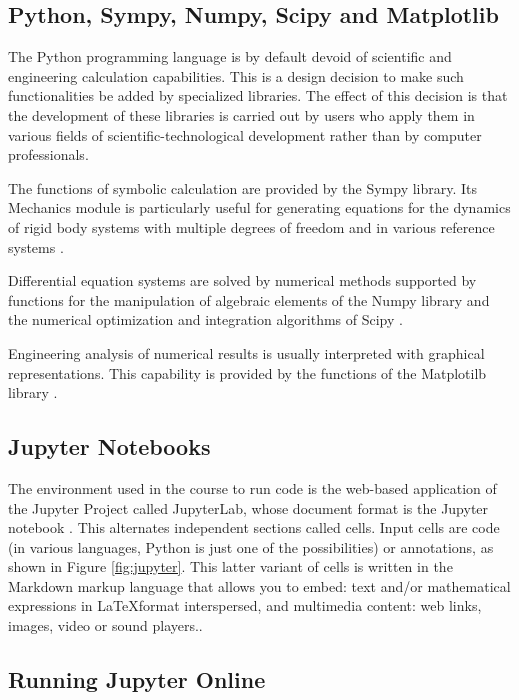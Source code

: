 \subsection{Python, Sympy, Numpy, Scipy and Matplotlib}

The Python programming language is by default devoid of scientific and engineering calculation capabilities. This is a design decision to make such functionalities be added by specialized libraries. The effect of this decision is that the development of these libraries is carried out by users who apply them in various fields of scientific-technological development rather than by computer professionals.

The functions of symbolic calculation are provided by the Sympy library. Its Mechanics module is particularly useful for generating equations for the dynamics of rigid body systems with multiple degrees of freedom and in various reference systems \cite{simpy}.

Differential equation systems are solved by numerical methods supported by functions for the manipulation of algebraic elements of the Numpy library \cite{numpy} and the numerical optimization and integration algorithms of Scipy \cite{SciPy}.

Engineering analysis of numerical results is usually interpreted with graphical representations. This capability is provided by the functions of the Matplotilb library \cite{matplotlib}.

\subsection{Jupyter Notebooks}

The environment used in the course to run code is the web-based application of the Jupyter Project called JupyterLab, whose document format is the Jupyter notebook \cite{Kluyver2016jupyter}. This alternates independent sections called cells. Input cells are code (in various languages, Python is just one of the possibilities) or annotations, as shown in Figure \ref{fig:jupyter}. This latter variant of cells is written in the Markdown markup language \cite{markdown} that allows you to embed: text and/or mathematical expressions in \LaTeX format interspersed, and multimedia content: web links, images, video or sound players..

\subsection{Running Jupyter Online}

